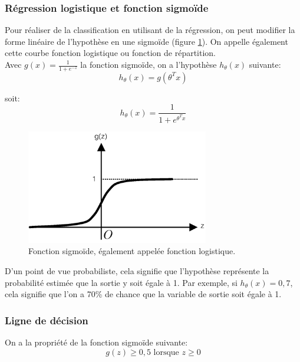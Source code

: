 \subsubsection{Régression logistique et fonction sigmoïde}
\label{Le Machine Learning: Les différents algorithmes: La regression logistique: Régression logistique et fonction sigmoïde}
Pour réaliser de la classification en utilisant de la régression,  on peut modifier la forme linéaire de l'hypothèse en une sigmoïde (figure \ref{fig:Fonction sigmoïde}). On appelle également cette courbe fonction logistique ou fonction de répartition.  \\

Avec $g(x) = \frac{1}{1 + e^{-z}}$  la fonction sigmoïde, on a l'hypothèse $h_\theta(x)$ suivante: 
\begin{equation}
	h_\theta(x)=g(\theta^Tx) 
\end{equation}

soit: 
\begin{equation}
h_\theta(x)=\frac{1}{1 + e^{\theta^Tx}} 
\end{equation}

\begin{figure}[h]
	\centering\includegraphics[height=5cm]{images/sigmoid.png}
	\caption[Fonction sigmoïde]{Fonction sigmoïde, également appelée fonction logistique.}
	\label{fig:Fonction sigmoïde}
\end{figure}

D'un point de vue probabiliste, cela signifie que l'hypothèse représente la probabilité estimée que la sortie y soit égale à 1. Par exemple, si $h_\theta(x)=0,7$, cela signifie que l'on a 70\% de chance que la variable de sortie soit égale à 1. 

\subsubsection{Ligne de décision}
\label{Le Machine Learning: Les différents algorithmes: La regression logistique: Ligne de décision}
On a la propriété de la fonction sigmoïde suivante: 
\begin{equation}
 g(z) \ge 0,5 \text{ lorsque } z \ge 0
\end{equation}

